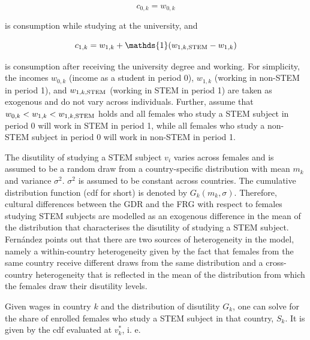 \documentclass[a4paper, oneside, hyperfootnotes = false]{article}
\begin{document}
{\vspace{-8mm}

\begin{equation*}
	\label{eq:c0k}
	c_{0,k} = w_{0,k}
\end{equation*}

\noindent is consumption while studying at the university, and 

\vspace{-8mm}

\begin{equation*}
	\label{eq:c1k}
	c_{1,k} = w_{1,k} + \mathds{1}(w_{1,k,\textnormal{STEM}} - w_{1,k})
\end{equation*}

\noindent is consumption after receiving the university degree and working.
For simplicity, the incomes $w_{0,k}$ (income as a student in period 0), $w_{1,k}$ (working in non-STEM in period 1), and $w_{1,k,\textnormal{STEM}}$ (working in STEM in period 1) are taken as exogenous and do not vary across individuals.
Further, assume that $w_{0,k} < w_{1,k} < w_{1,k,\textnormal{STEM}}$ holds and all females who study a STEM subject in period 0 will work in STEM in period 1, while all females who study a non-STEM subject in period 0 will work in non-STEM in period 1.

The disutility of studying a STEM subject $v_{i}$ varies across females and is assumed to be a random draw from a country-specific distribution with mean $m_{k}$ and variance $\sigma^{2}$.
$\sigma^{2}$ is assumed to be constant across countries.
The cumulative distribution function (cdf for short) is denoted by $G_{k}(m_{k}, \sigma)$.
Therefore, cultural differences between the GDR and the FRG with respect to females studying STEM subjects are modelled as an exogenous difference in the mean of the distribution that characterises the disutility of studying a STEM subject.
Fernández points out that there are two sources of heterogeneity in the model, namely a within-country heterogeneity given by the fact that females from the same country receive different draws from the same distribution and a cross-country heterogeneity that is reflected in the mean of the distribution from which the females draw their disutility levels.

Given wages in country $k$ and the distribution of disutility $G_{k}$, one can solve for the share of enrolled females who study a STEM subject in that country, $S_{k}$. It is given by the cdf evaluated at $v^{*}_{k}$, i. e.

\vspace{-8mm}

}
\end{document}
